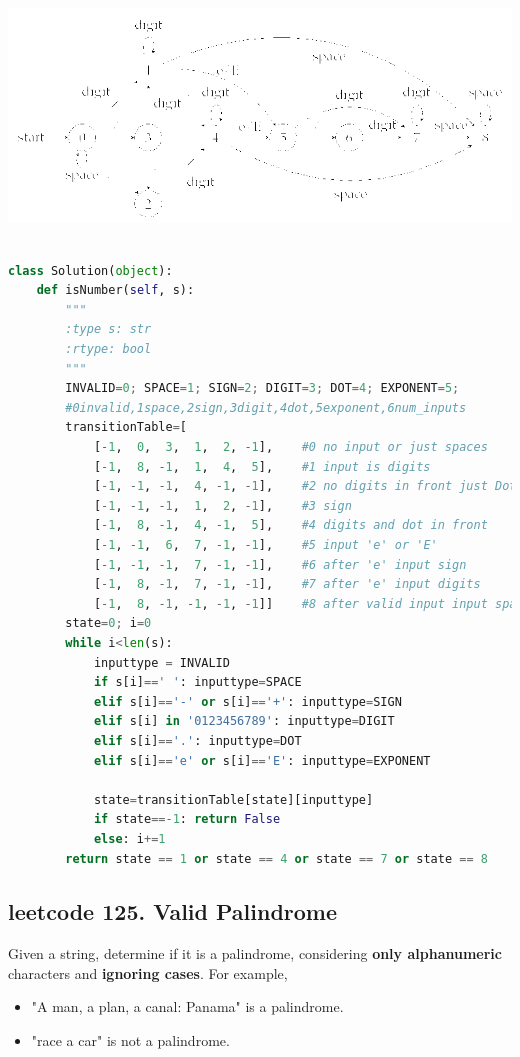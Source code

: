 \documentclass[a4paper,10pt]{article}
\begin{document}
\includegraphics[width=\textwidth]{state} \\
\begin{lstlisting}[language=Python, caption=Problem65. Valid Number]

class Solution(object):
    def isNumber(self, s):
        """
        :type s: str
        :rtype: bool
        """
        INVALID=0; SPACE=1; SIGN=2; DIGIT=3; DOT=4; EXPONENT=5;
        #0invalid,1space,2sign,3digit,4dot,5exponent,6num_inputs
        transitionTable=[
            [-1,  0,  3,  1,  2, -1],    #0 no input or just spaces 
            [-1,  8, -1,  1,  4,  5],    #1 input is digits 
            [-1, -1, -1,  4, -1, -1],    #2 no digits in front just Dot 
            [-1, -1, -1,  1,  2, -1],    #3 sign 
            [-1,  8, -1,  4, -1,  5],    #4 digits and dot in front 
            [-1, -1,  6,  7, -1, -1],    #5 input 'e' or 'E' 
            [-1, -1, -1,  7, -1, -1],    #6 after 'e' input sign 
            [-1,  8, -1,  7, -1, -1],    #7 after 'e' input digits 
            [-1,  8, -1, -1, -1, -1]]    #8 after valid input input space
        state=0; i=0
        while i<len(s):
            inputtype = INVALID
            if s[i]==' ': inputtype=SPACE
            elif s[i]=='-' or s[i]=='+': inputtype=SIGN
            elif s[i] in '0123456789': inputtype=DIGIT
            elif s[i]=='.': inputtype=DOT
            elif s[i]=='e' or s[i]=='E': inputtype=EXPONENT
            
            state=transitionTable[state][inputtype]
            if state==-1: return False
            else: i+=1
        return state == 1 or state == 4 or state == 7 or state == 8
\end{lstlisting}


\subsection{leetcode 125. Valid Palindrome}
Given a string, determine if it is a palindrome, considering \textbf{only alphanumeric} characters and \textbf{ignoring cases}. For example,
\begin{itemize}
    \item "A man, a plan, a canal: Panama" is a palindrome.
    \item "race a car" is not a palindrome.
\end{itemize}
\end{document}
